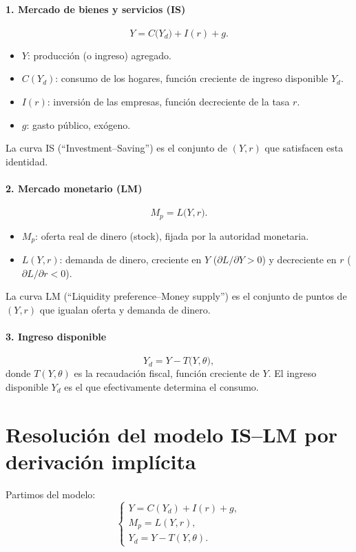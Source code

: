 \documentclass{article}
\begin{document}
\paragraph{1. Mercado de bienes y servicios (IS)}  
\[
Y = C\bigl(Y_d\bigr) + I(r) + g.
\]
\begin{itemize}
  \item \(Y\): producción (o ingreso) agregado.
  \item \(C(Y_d)\): consumo de los hogares, función creciente de ingreso disponible \(Y_d\).
  \item \(I(r)\): inversión de las empresas, función decreciente de la tasa \(r\).
  \item \(g\): gasto público, exógeno.
\end{itemize}
La curva IS (“Investment–Saving”) es el conjunto de \((Y,r)\) que satisfacen esta identidad. 
\bigskip

\paragraph{2. Mercado monetario (LM)}  
\[
M_p = L\bigl(Y,r\bigr).
\]
\begin{itemize}
  \item \(M_p\): oferta real de dinero (stock), fijada por la autoridad monetaria.
  \item \(L(Y,r)\): demanda de dinero, creciente en \(Y\) (\(\partial L/\partial Y>0\)) y decreciente en \(r\) (\(\partial L/\partial r<0\)).
\end{itemize}
La curva LM (“Liquidity preference–Money supply”) es el conjunto de puntos de \((Y,r)\) que igualan oferta y demanda de dinero. 

\bigskip

\paragraph{3. Ingreso disponible}  
\[
Y_d = Y - T\bigl(Y,\theta\bigr),
\]
donde \(T(Y,\theta)\) es la recaudación fiscal, función creciente de \(Y\). El ingreso disponible \(Y_d\) es el que efectivamente determina el consumo.

\bigskip



\section*{Resolución del modelo IS–LM por derivación implícita}


Partimos del modelo:
\[
\begin{cases}
Y = C(Y_d) + I(r) + g,\\
M_p = L(Y,r),\\
Y_d = Y - T(Y,\theta).
\end{cases}
\]
\end{document}
